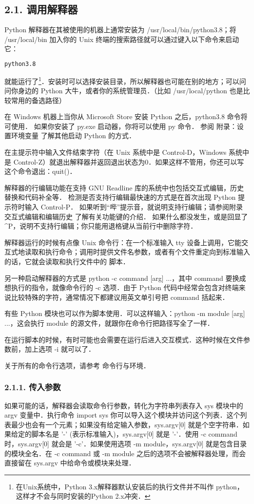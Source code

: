 \subsection{2.1. 调用解释器}
Python 解释器在其被使用的机器上通常安装为 /usr/local/bin/python3.8；将 /usr/local/bin 加入你的 Unix 终端的搜索路径就可以通过键入以下命令来启动它：

\begin{lstlisting}[language=bash]
python3.8
\end{lstlisting}

就能运行了\footnote{在Unix系统中，Python 3.x解释器默认安装后的执行文件并不叫作 python，这样才不会与同时安装的Python 2.x冲突．}．安装时可以选择安装目录，所以解释器也可能在别的地方；可以问问你身边的 Python 大牛，或者你的系统管理员．（比如 /usr/local/python 也是比较常用的备选路径）

在 Windows 机器上当你从 Microsoft Store 安装 Python 之后，python3.8 命令将可使用． 如果你安装了 py.exe 启动器，你将可以使用 py 命令． 参阅 附录：设置环境变量 了解其他启动 Python 的方式．

在主提示符中输入文件结束字符（在 Unix 系统中是 Control-D，Windows 系统中是 Control-Z）就退出解释器并返回退出状态为0．如果这样不管用，你还可以写这个命令退出：quit()．

解释器的行编辑功能在支持 GNU Readline 库的系统中也包括交互式编辑，历史替换和代码补全等． 检测是否支持行编辑最快速的方式是在首次出现 Python 提示符时输入 Control-P． 如果听到“哔”提示音，就说明支持行编辑；请参阅附录 交互式编辑和编辑历史 了解有关功能键的介绍． 如果什么都没发生，或是回显了 ^P，说明不支持行编辑；你只能用退格键从当前行中删除字符．

解释器运行的时候有点像 Unix 命令行：在一个标准输入 tty 设备上调用，它能交互式地读取和执行命令；调用时提供文件名参数，或者有个文件重定向到标准输入的话，它就会读取和执行文件中的 脚本．

另一种启动解释器的方式是 python -c command [arg] ...，其中 command 要换成想执行的指令，就像命令行的 -c 选项．由于 Python 代码中经常会包含对终端来说比较特殊的字符，通常情况下都建议用英文单引号把 command 括起来．

有些 Python 模块也可以作为脚本使用．可以这样输入：python -m module [arg] ...，这会执行 module 的源文件，就跟你在命令行把路径写全了一样．

在运行脚本的时候，有时可能也会需要在运行后进入交互模式．这种时候在文件参数前，加上选项 -i 就可以了．

关于所有的命令行选项，请参考 命令行与环境．

\subsubsection{2.1.1. 传入参数}
如果可能的话，解释器会读取命令行参数，转化为字符串列表存入 sys 模块中的 argv 变量中．执行命令 import sys 你可以导入这个模块并访问这个列表．这个列表最少也会有一个元素；如果没有给定输入参数，sys.argv[0] 就是个空字符串．如果给定的脚本名是 '-' (表示标准输入)，sys.argv[0] 就是 '-'．使用 -c command 时，sys.argv[0] 就会是 '-c'．如果使用选项 -m module，sys.argv[0] 就是包含目录的模块全名．在 -c command 或 -m module 之后的选项不会被解释器处理，而会直接留在 sys.argv 中给命令或模块来处理．

